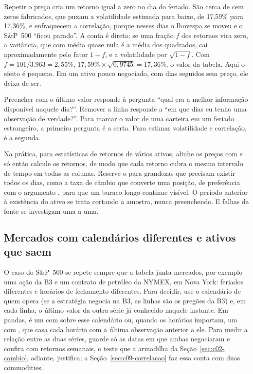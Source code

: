 Repetir o preço cria um retorno igual a zero no dia do feriado. São cerca de cem zeros fabricados, que puxam a volatilidade estimada para baixo, de 17,59\% para 17,36\%, e enfraquecem a correlação, porque nesses dias o Ibovespa se moveu e o S\&P~500 ``ficou parado''. A conta é direta: se uma fração $f$ dos retornos vira zero, a variância, que com média quase nula é a média dos quadrados, cai aproximadamente pelo fator $1 - f$, e a volatilidade por $\sqrt{1 - f}$. Com $f = 101/3.963 = 2,55\%$, $17,59\% \times \sqrt{0,9745} = 17,36\%$, o valor da tabela. Aqui o efeito é pequeno. Em um ativo pouco negociado, com dias seguidos sem preço, ele deixa de ser.

\begin{intuicao}
Preencher com o último valor responde à pergunta ``qual era a melhor informação disponível naquele dia?''. Remover a linha responde a ``em que dias eu tenho uma observação de verdade?''. Para marcar o valor de uma carteira em um feriado estrangeiro, a primeira pergunta é a certa. Para estimar volatilidade e correlação, é a segunda.
\end{intuicao}

Na prática, para estatísticas de retornos de vários ativos, alinhe os preços com  e só então calcule os retornos, de modo que cada retorno cubra o mesmo intervalo de tempo em todas as colunas. Reserve o  para grandezas que precisam existir todos os dias, como a taxa de câmbio que converte uma posição, de preferência com o argumento , para que um buraco longo continue visível. O período anterior à existência do ativo se trata cortando a amostra, nunca preenchendo. E falhas da fonte se investigam uma a uma.

\subsection{Mercados com calendários diferentes e ativos que saem}
\label{sec:c02-calendarios}

O caso do S\&P~500 se repete sempre que a tabela junta mercados, por exemplo uma ação da B3 e um contrato de petróleo da NYMEX, em Nova York: feriados diferentes e horários de fechamento diferentes. Para decidir, use o calendário de quem opera (se a estratégia negocia na B3, as linhas são os pregões da B3) e, em cada linha, o último valor da outra série já conhecido naquele instante. Em pandas, é um  com  sobre esse calendário ou, quando os horários importam, um  com , que casa cada horário com a última observação anterior a ele. Para medir a relação entre as duas séries, guarde só as datas em que ambas negociaram e confira com retornos semanais, o teste que a armadilha da Seção~\ref{sec:c02-cambio}, adiante, justifica; a Seção~\ref{sec:c09-correlacao} faz essa conta com duas commodities.

